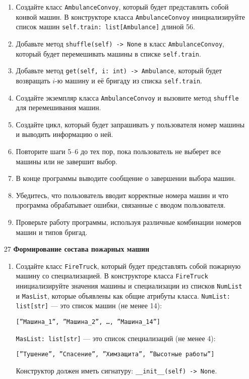 \begin{enumerate}
\begin{enumerate}
    \item Создайте класс \texttt{AmbulanceConvoy}, который будет представлять собой конвой машин. В конструкторе класса \texttt{AmbulanceConvoy} инициализируйте список машин \texttt{self.train: list[Ambulance]} длиной 56.

    \item Добавьте метод \texttt{shuffle(self) -> None} в класс \texttt{AmbulanceConvoy}, который будет перемешивать машины в списке \texttt{self.train}.

    \item Добавьте метод \texttt{get(self, i: int) -> Ambulance}, который будет возвращать $i$-ю машину и её бригаду из списка \texttt{self.train}.

    \item Создайте экземпляр класса \texttt{AmbulanceConvoy} и вызовите метод \texttt{shuffle} для перемешивания машин.

    \item Создайте цикл, который будет запрашивать у пользователя номер машины и выводить информацию о ней.

    \item Повторите шаги 5–6 до тех пор, пока пользователь не выберет все машины или не завершит выбор.

    \item В конце программы выводите сообщение о завершении выбора машин.

    \item Убедитесь, что пользователь вводит корректные номера машин и что программа обрабатывает ошибки, связанные с вводом пользователя.

    \item Проверьте работу программы, используя различные комбинации номеров машин и типов бригад.
\end{enumerate}

\item[27] \textbf{Формирование состава пожарных машин}
\begin{enumerate}
    \item Создайте класс \texttt{FireTruck}, который будет представлять собой пожарную машину со специализацией. В конструкторе класса \texttt{FireTruck} инициализируйте значения машины и специализации из списков \texttt{NumList} и \texttt{MasList}, которые объявлены как общие атрибуты класса. \texttt{NumList: list[str]} — это список машин (не менее 14): 
    \begin{center}
        \texttt{[''Машина\_1'', ''Машина\_2'', \dots, ''Машина\_14'']}
    \end{center}
    \texttt{MasList: list[str]} — это список специализаций (не менее 4):
    \begin{center}
        \texttt{[''Тушение'', ''Спасение'', ''Химзащита'', ''Высотные работы'']}
    \end{center}
    Конструктор должен иметь сигнатуру: \texttt{\_\_init\_\_(self) -> None}.


\end{enumerate}
\end{enumerate}
